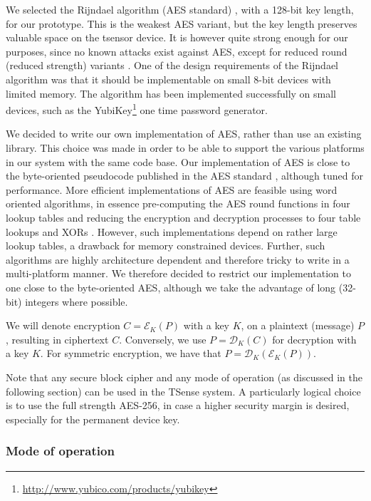 We selected the Rijndael algorithm (AES standard) , with a 128-bit key length, for our prototype. This is the weakest AES variant, but the key length preserves valuable space on the tsensor device. It is however quite strong enough for our purposes, since no known attacks exist against AES, except for reduced round (reduced strength) variants \cite{}. One of the design requirements of the Rijndael algorithm was that it should be implementable on small 8-bit devices with limited memory. The algorithm has been implemented successfully on small devices, such as the YubiKey\footnote{\url{http://www.yubico.com/products/yubikey}} one time password generator.

We decided to write our own implementation of AES, rather than use an existing library. This choice was made in order to be able to support the various platforms in our system with the same code base. Our implementation of AES is close to the byte-oriented pseudocode published in the AES standard , although tuned for performance. More efficient implementations of AES are feasible using word oriented algorithms, in essence pre-computing the AES round functions in four lookup tables and reducing the encryption and decryption processes to four table lookups and XORs \cite[Section 5.2]{daemen1999}. However, such implementations depend on rather large lookup tables, a drawback for memory constrained devices. Further, such algorithms are highly architecture dependent and therefore tricky to write in a multi-platform manner. We therefore decided to restrict our implementation to one close to the byte-oriented AES, although we take the advantage of long (32-bit) integers where possible.

We will denote encryption $C=\mathcal{E}_K(P)$ with a key $K$, on a plaintext (message) $P$, resulting in ciphertext $C$. Conversely, we use $P=\mathcal{D}_K(C)$ for decryption with a key $K$. For symmetric encryption, we have that $P=\mathcal{D}_K(\mathcal{E}_K(P))$.

Note that any secure block cipher and any mode of operation (as discussed in the following section) can be used in the TSense system. A particularly logical choice is to use the full strength AES-256, in case a higher security margin is desired, especially for the permanent device key.

\subsubsection{Mode of operation}

